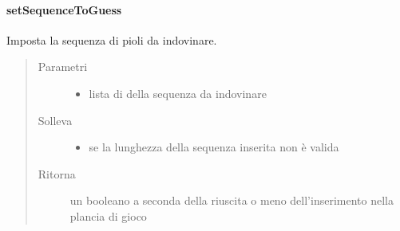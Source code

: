 \documentclass[letterpaper,10pt,italian,openany,oneside]{sphinxmanual}
\begin{document}
\paragraph{setSequenceToGuess}
\label{\detokenize{source/it/unicam/cs/pa/mastermind/gamecore/BoardModel:setsequencetoguess}}

\begin{fulllineitems}
\label{\detokenize{source/it/unicam/cs/pa/mastermind/gamecore/BoardModel:it.unicam.cs.pa.mastermind.gamecore.BoardModel.setSequenceToGuess(List)}}
Imposta la sequenza di pioli da indovinare.
\begin{quote}\begin{description}
\item[{Parametri}] \leavevmode\begin{itemize}
\item {} 
 \textendash{} lista di  della sequenza da indovinare

\end{itemize}

\item[{Solleva}] \leavevmode\begin{itemize}
\item {} 
 \textendash{} se la lunghezza della sequenza inserita non è valida

\end{itemize}

\item[{Ritorna}] \leavevmode
un booleano a seconda della riuscita o meno dell’inserimento nella plancia di gioco

\end{description}\end{quote}

\end{fulllineitems}
\end{document}
